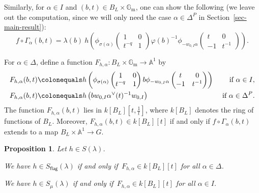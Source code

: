 \documentclass[11pt]{amsart}
\numberwithin{equation}{section}
\newtheorem{proposition}[theorem]{Proposition}
\theoremstyle{definition}
\theoremstyle{remark}
\newcommand{\flag}{\mathsf{flag}}
\renewcommand{\AA}{\mathbb{A}}
\newcommand{\GG}{\mathbb{G}}
\begin{document}
Similarly, for $\alpha\in I$ and $(b,t)\in B_L\times \GG_{\mathrm{m}}$, one can show the following (we leave out the computation, since we will only need the case $\alpha\in \Delta^P$ in Section~\ref{sec-main-result}):
\begin{equation}
 f\circ \Gamma_\alpha(b,t)=   \lambda(b) \ h\left(\phi_{\sigma(\alpha)}\left(\begin{matrix}
1&0\\t^{-q}&1\end{matrix} \right) \varphi(b)^{-1} 
 \phi_{-w_{0,I}\alpha}\left(\begin{matrix}
t&0\\-1&t^{-1}\end{matrix} \right)\right).
\end{equation}


For $\alpha\in \Delta$, define a function $F_{h,\alpha}\colon B_L\times \GG_{\mathrm{m}}\to \AA^1$ by
\begin{align}
F_{h,\alpha}(b,t) &\colonequals h\left(\phi_{\sigma(\alpha)}\left(\begin{matrix}
1&0\\t^{-q}&1\end{matrix} \right) b
 \phi_{-w_{0,I}\alpha}\left(\begin{matrix}
t&0\\-1&t^{-1}\end{matrix} \right)\right) &\textrm{ if }\alpha\in I, \\
F_{h,\alpha}(b,t) &\colonequals h\left(b w_{0,I} \alpha^{\vee}(t)^{-1} w_{0,I}\right) &\textrm{ if }\alpha\in \Delta^P.
\end{align}
The function $F_{h,\alpha}(b,t)$ lies in $k[B_L][t,\frac{1}{t}]$, where $k[B_L]$ denotes the ring of functions of $B_L$. Moreover, $F_{h,\alpha}(b,t)\in k[B_L][t]$ if and only if $f\circ \Gamma_{\alpha}(b,t)$ extends to a map $B_L\times \AA^1\to G$. 

\begin{proposition}\label{prop-Slambda}
Let $h\in S(\lambda)$.
\begin{assertionlist}
\item \label{item-Sflcd} We have $h\in S_{\flag}(\lambda)$ if and only if\, $F_{h,\alpha}\in k[B_L][t]$ for all $\alpha\in \Delta$.
\item \label{item-Smucd} We have $h\in S_\mu(\lambda)$ if and only if\, $F_{h,\alpha}\in k[B_L][t]$ for all $\alpha\in I$.
\end{assertionlist}
\end{proposition}
\end{document}
